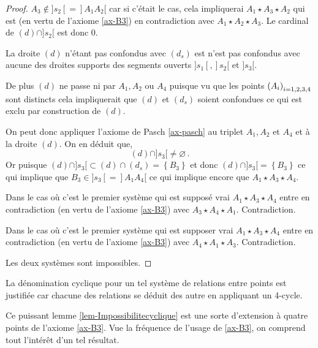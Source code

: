 \begin{lem}
\begin{proof}
        $A_3 \notin ]s_2[ = ]A_1 A_2[$ car si c'était le cas, cela impliquerai $A_1 \star A_3 \star A_2$ qui est (en vertu de l'axiome \ref{ax-B3}) en contradiction avec $A_{1} \star A_{2} \star A_{3}$. Le cardinal de $(d)\cap]s_2[$ est donc $0$.

        La droite $(d)$ n'étant pas confondus avec $(d_s)$ est n'est pas confondus avec aucune des droites supports des segments ouverts $]s_1[,]s_2[$ et $]s_3[$. 

        De plus $(d)$ ne passe ni par $A_1,A_2$ ou $A_4$ puisque vu que les points $\left(A_{i}\right)_{i = 1,2,3,4}$ sont distincts cela impliquerait que $(d)$ et $(d_s)$ soient confondues ce qui est exclu par construction de $(d)$.

        On peut donc appliquer l'axiome de Pasch \ref{ax-pasch} au triplet $A_1,A_2$ et $A_4$ et à la droite $(d)$. On en déduit que,
        \begin{equation*}
            (d)\cap]s_3[\neq \varnothing\,.
        \end{equation*}
        Or puisque $(d)\cap]s_3[ \subset (d)\cap (d_s) = \left\{B_3 \right\}$ et donc $(d)\cap]s_3[ = \left\{B_3 \right\}$ ce qui implique que $B_3 \in ]s_3[ = ]A_1 A_4[$ ce qui implique encore que $A_1 \star A_3 \star A_4$. 
        
        Dans le cas où c'est le premier système qui est supposé vrai $A_1 \star A_3 \star A_4$ entre en contradiction (en vertu de l'axiome \ref{ax-B3}) avec $A_{3} \star A_{4} \star A_{1}$. Contradiction.

        Dans le cas où c'est le premier système qui est supposer vrai $A_1 \star A_3 \star A_4$ entre en contradiction (en vertu de l'axiome \ref{ax-B3}) avec $A_{4} \star A_{1} \star A_{3}$. Contradiction.

        Les deux systèmes sont impossibles.
    \end{proof}
\end{lem}
\begin{rema}
    La dénomination cyclique pour un tel système de relations entre points est justifiée car chacune des relations se déduit des autre en appliquant un 4-cycle. 
\end{rema}
\begin{rema}
    Ce puissant lemme \ref{lem-Impossibilitecyclique} est une sorte d'extension à quatre points de l'axiome \ref{ax-B3}. Vue la fréquence de l'usage de \ref{ax-B3}, on comprend tout l'intérêt d'un tel résultat.
\end{rema}

